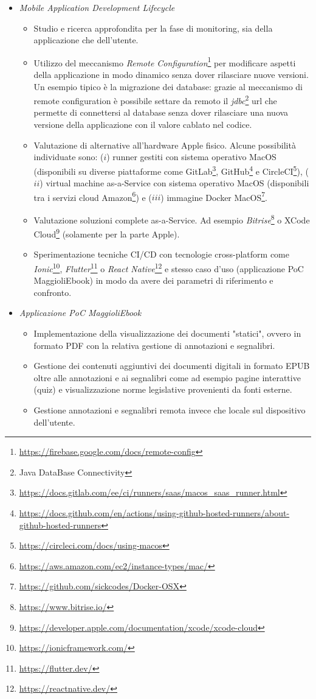 \begin{itemize}
    \item \textit{Mobile Application Development Lifecycle}
    \begin{itemize}
        \item Studio e ricerca approfondita per la fase di monitoring, sia della applicazione che dell'utente.
        \item Utilizzo del meccanismo \textit{Remote Configuration}\footnote{\url{https://firebase.google.com/docs/remote-config}} per modificare aspetti della applicazione in modo dinamico senza dover rilasciare nuove versioni. Un esempio tipico è la migrazione dei database: grazie al meccanismo di remote configuration è possibile settare da remoto il \textit{jdbc}\footnote{Java DataBase Connectivity} url che permette di connettersi al database senza dover rilasciare una nuova versione della applicazione con il valore cablato nel codice.
        \item Valutazione di alternative all'hardware Apple fisico. Alcune possibilità individuate sono: ($i$) runner gestiti con sistema operativo MacOS (disponibili su diverse piattaforme come GitLab\footnote{\url{https://docs.gitlab.com/ee/ci/runners/saas/macos_saas_runner.html}}, GitHub\footnote{\url{https://docs.github.com/en/actions/using-github-hosted-runners/about-github-hosted-runners}} e CircleCI\footnote{\url{https://circleci.com/docs/using-macos}}), ($ii$) virtual machine as-a-Service con sistema operativo MacOS (disponibili tra i servizi cloud Amazon\footnote{\url{https://aws.amazon.com/ec2/instance-types/mac/}}) e ($iii$) immagine Docker MacOS\footnote{\url{https://github.com/sickcodes/Docker-OSX}}.
        \item Valutazione soluzioni complete as-a-Service. Ad esempio \textit{Bitrise}\footnote{\url{https://www.bitrise.io/}} o XCode Cloud\footnote{\url{https://developer.apple.com/documentation/xcode/xcode-cloud}} (solamente per la parte Apple).
        \item Sperimentazione tecniche CI/CD con tecnologie cross-platform come \textit{Ionic}\footnote{\url{https://ionicframework.com/}}, \textit{Flutter}\footnote{\url{https://flutter.dev/}} o \textit{React Native}\footnote{\url{https://reactnative.dev/}} e stesso caso d'uso (applicazione PoC MaggioliEbook) in modo da avere dei parametri di riferimento e confronto.
    \end{itemize}
    \item \textit{Applicazione PoC MaggioliEbook}
    \begin{itemize}
        \item Implementazione della visualizzazione dei documenti "statici", ovvero in formato PDF con la relativa gestione di annotazioni e segnalibri.
        \item Gestione dei contenuti aggiuntivi dei documenti digitali in formato EPUB oltre alle annotazioni e ai segnalibri come ad esempio pagine interattive (quiz) e visualizzazione norme legislative provenienti da fonti esterne.
        \item Gestione annotazioni e segnalibri remota invece che locale sul dispositivo dell'utente.
    \end{itemize}
\end{itemize}
